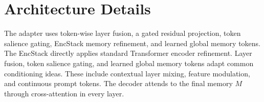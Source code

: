 \documentclass[11pt]{article}
\begin{document}
\section{Architecture Details}

The adapter uses token-wise layer fusion, a gated residual projection, token salience gating, EncStack memory refinement, and learned global memory tokens.
The EncStack directly applies standard Transformer encoder refinement.
Layer fusion, token salience gating, and learned global memory tokens adapt common conditioning ideas.
These include contextual layer mixing, feature modulation, and continuous prompt tokens.
The decoder attends to the final memory $M$ through cross-attention in every layer.
\end{document}
